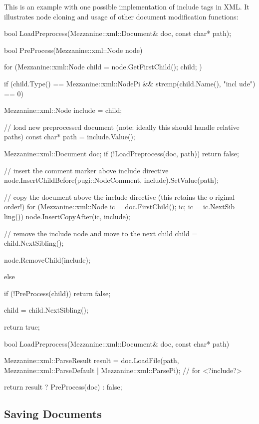 This is an example with one possible implementation of include tags in XML. It illustrates node cloning and usage of other document modification functions: 
\begin{DoxyCode}
 bool LoadPreprocess(Mezzanine::xml::Document& doc, const char* path);

 bool PreProcess(Mezzanine::xml::Node node)
 {
     for (Mezzanine::xml::Node child = node.GetFirstChild(); child; )
     {
         if (child.Type() == Mezzanine::xml::NodePi && strcmp(child.Name(), "incl
      ude") == 0)
         {
             Mezzanine::xml::Node include = child;

             // load new preprocessed document (note: ideally this should handle 
      relative paths)
             const char* path = include.Value();

             Mezzanine::xml::Document doc;
             if (!LoadPreprocess(doc, path)) return false;

             // insert the comment marker above include directive
             node.InsertChildBefore(pugi::NodeComment, include).SetValue(path);

             // copy the document above the include directive (this retains the o
      riginal order!)
             for (Mezzanine::xml::Node ic = doc.FirstChild(); ic; ic = ic.NextSib
      ling())
             {
                 node.InsertCopyAfter(ic, include);
             }

             // remove the include node and move to the next child
             child = child.NextSibling();

             node.RemoveChild(include);
         }
         else
         {
             if (!PreProcess(child)) return false;

             child = child.NextSibling();
         }
     }

     return true;
 }

 bool LoadPreprocess(Mezzanine::xml::Document& doc, const char* path)
 {
     Mezzanine::xml::ParseResult result = doc.LoadFile(path, 
      Mezzanine::xml::ParseDefault | Mezzanine::xml::ParsePi); // for <?include?>

     return result ? PreProcess(doc) : false;
 }
\end{DoxyCode}
 \hypertarget{XMLManual_XMLSaving}{}\subsection{Saving Documents}\label{XMLManual_XMLSaving}

